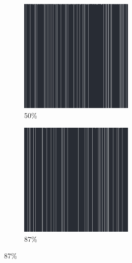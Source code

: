 \documentclass[12pt, fleqn]{report}                             %
\theoremstyle{break}                                            %
\begin{document}
\begin{figure}[ht!]
\begin{subfigure}[b]{0.4\linewidth}
          \includegraphics[width=0.6\textwidth]{Images/36/c.png}
          \caption{50\%}
        \end{subfigure}
        \begin{subfigure}[b]{0.4\linewidth}
          \includegraphics[width=0.6\textwidth]{Images/36/d.png}
          \caption{87\%}
        \end{subfigure}
      \end{figure}
\end{document}
